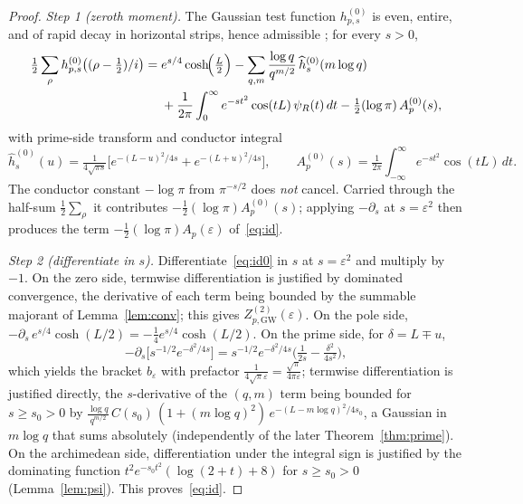 \documentclass[11pt]{article}
\newcommand{\ZtwoGW}{Z_{p,\mathrm{GW}}^{(2)}}   %
\newcommand{\psiR}{\psi_{R}}                %
\begin{document}
\begin{proof}
\emph{Step 1 (zeroth moment).}
The Gaussian test function $h^{(0)}_{p,s}$ is even, entire, and of rapid
decay in horizontal strips, hence admissible
\cite[Thm.~5.12]{IwaniecKowalski04}; for every $s>0$,
\begin{equation}\label{eq:id0}
\begin{aligned}
\tfrac12\sum_\rho h^{(0)}_{p,s}\bigl((\rho-\tfrac12)/i\bigr)
 ={}& e^{s/4}\cosh\!\Bigl(\tfrac{L}{2}\Bigr)
 - \sum_{q,m}\frac{\log q}{q^{m/2}}\,\widehat h^{(0)}_s(m\log q)\\
 &{}+ \frac{1}{2\pi}\int_0^\infty e^{-s t^2}\cos(t L)\,\psiR(t)\,dt
 - \tfrac12(\log\pi)\,A^{(0)}_p(s),
\end{aligned}
\end{equation}
with prime-side transform and conductor integral
\[
\widehat h^{(0)}_s(u)=\tfrac{1}{4\sqrt{\pi s}}
\bigl[e^{-(L-u)^2/4s}+e^{-(L+u)^2/4s}\bigr],
\qquad
A^{(0)}_p(s)=\tfrac{1}{2\pi}\int_{-\infty}^\infty e^{-st^2}\cos(tL)\,dt.
\]
The conductor constant $-\log\pi$ from $\pi^{-s/2}$ does \emph{not} cancel.
Carried through the half-sum $\tfrac12\sum_\rho$ it contributes
$-\tfrac12(\log\pi)A^{(0)}_p(s)$; applying $-\partial_s$ at
$s=\varepsilon^2$ then produces the term $-\tfrac12(\log\pi)A_p(\varepsilon)$
of~\eqref{eq:id}.

\emph{Step 2 (differentiate in $s$).}
Differentiate~\eqref{eq:id0} in $s$ at $s=\varepsilon^2$ and multiply by
$-1$.
On the zero side, termwise differentiation is justified by dominated
convergence, the derivative of each term being bounded by the summable
majorant of Lemma~\ref{lem:conv}; this gives $\ZtwoGW(\varepsilon)$.
On the pole side,
$-\partial_s\,e^{s/4}\cosh(L/2)=-\tfrac14 e^{s/4}\cosh(L/2)$.
On the prime side, for $\delta=L\mp u$,
\[
-\partial_s\bigl[s^{-1/2}e^{-\delta^2/4s}\bigr]
=s^{-1/2}e^{-\delta^2/4s}\bigl(\tfrac{1}{2s}-\tfrac{\delta^2}{4s^2}\bigr),
\]
which yields the bracket $b_\varepsilon$ with prefactor
$\tfrac{1}{4\sqrt\pi\varepsilon}=\tfrac{\sqrt\pi}{4\pi\varepsilon}$;
termwise differentiation is justified directly, the $s$-derivative of the
$(q,m)$ term being bounded for $s\ge s_0>0$ by
$\tfrac{\log q}{q^{m/2}}\,C(s_0)\,(1+(m\log q)^2)\,e^{-(L-m\log q)^2/4s_0}$,
a Gaussian in $m\log q$ that sums absolutely (independently of the later
Theorem~\ref{thm:prime}).
On the archimedean side, differentiation under the integral sign is
justified by the dominating function
$t^2 e^{-s_0 t^2}(\log(2+t)+8)$ for $s\ge s_0>0$ (Lemma~\ref{lem:psi}).
This proves~\eqref{eq:id}.
\end{proof}
\end{document}
